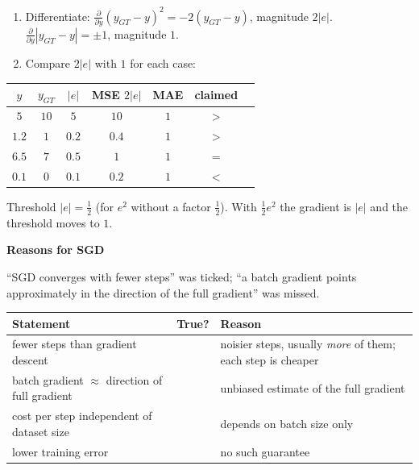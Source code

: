 \documentclass[11pt,a4paper]{article}
\newcommand{\ok}{\textcolor{rightc}{\ding{51}}}
\newcommand{\bad}{\textcolor{wrongc}{\ding{55}}}
\newcommand{\keep}[1]{\par
  \ifdim\dimexpr\pagegoal-\pagetotal\relax<#1\relax\newpage\fi}
\newcommand{\sub}[1]{\keep{6cm}\medskip
  {\sffamily\bfseries\large\color{accent}#1}\par\smallskip}
\begin{document}
\begin{steps}
\begin{enumerate}[leftmargin=*]
  \item Differentiate: $\frac{\partial}{\partial y}(y_{GT}-y)^2=-2(y_{GT}-y)$,
        magnitude $2|e|$. \quad $\frac{\partial}{\partial y}|y_{GT}-y|=\pm1$,
        magnitude $1$.
  \item Compare $2|e|$ with $1$ for each case:
\end{enumerate}
\centering\small
\begin{tabular}{@{}ccccccc@{}}
  \toprule
  $y$ & $y_{GT}$ & $|e|$ & MSE $2|e|$ & MAE & claimed & \\
  \midrule
  $5$ & $10$ & $5$ & $10$ & $1$ & $>$ & \ok \\
  $1.2$ & $1$ & $0.2$ & $0.4$ & $1$ & $>$ & \bad \\
  $6.5$ & $7$ & $0.5$ & $1$ & $1$ & $=$ & \ok \\
  $0.1$ & $0$ & $0.1$ & $0.2$ & $1$ & $<$ & \ok \\
  \bottomrule
\end{tabular}
\end{steps}

\begin{hook}
Threshold $|e|=\tfrac12$ (for $e^2$ without a factor $\tfrac12$). With
$\tfrac12e^2$ the gradient is $|e|$ and the threshold moves to $1$.
\end{hook}

\sub{Reasons for SGD}

\begin{yours}
``SGD converges with fewer steps'' was ticked; ``a batch gradient points
approximately in the direction of the full gradient'' was missed.
\end{yours}

\begin{center}\small
\begin{tabularx}{\linewidth}{@{}>{\raggedright\arraybackslash}p{5.6cm}c X@{}}
  \toprule
  Statement & True? & Reason \\
  \midrule
  fewer steps than gradient descent & \bad & noisier steps, usually
    \emph{more} of them; each step is cheaper \\
  batch gradient $\approx$ direction of full gradient & \ok & unbiased estimate
    of the full gradient \\
  cost per step independent of dataset size & \ok & depends on batch size only \\
  lower training error & \bad & no such guarantee \\
  \bottomrule
\end{tabularx}
\end{center}
\end{document}
